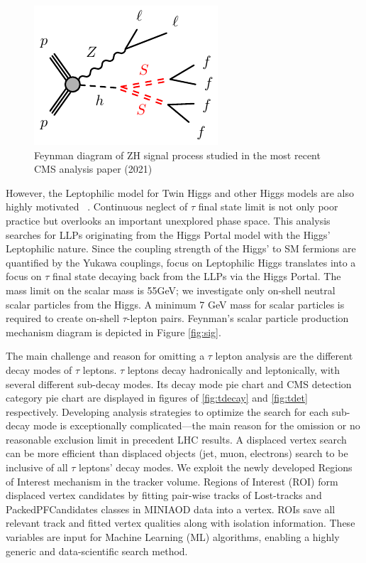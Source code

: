 \begin{figure}[h!]
  \caption{Feynman diagram of ZH signal process studied in the most recent CMS analysis paper (2021) \cite{ZHAN}}
  \label{fig:ZHfeyn}
  \centering
  \includegraphics[width=0.47\linewidth]{figs/Zh-llffff-SS.pdf}
\end{figure}


However, the Leptophilic model for Twin Higgs and other Higgs models are also highly motivated ~\cite{Lepto}. Continuous neglect of $\tau$ final state limit is not only poor practice but overlooks an important unexplored phase space.
This analysis searches for LLPs originating from the Higgs Portal model with the Higgs' Leptophilic nature.
Since the coupling strength of the Higgs' to SM fermions are quantified by the Yukawa couplings, focus on Leptophilic Higgs translates into a focus on $\tau$ final state decaying back from the LLPs via the Higgs Portal.
The mass limit on the scalar mass is 55GeV; we investigate only on-shell neutral scalar particles from the Higgs.
A minimum 7 GeV mass for scalar particles is required to create on-shell $\tau$-lepton pairs.
Feynman's scalar particle production mechanism diagram is depicted in Figure \ref{fig:sig}.


The main challenge and reason for omitting a $\tau$ lepton analysis are the different decay modes of $\tau$ leptons.
$\tau$ leptons decay hadronically and leptonically, with several different sub-decay modes.
Its decay mode pie chart and CMS detection category pie chart are displayed in figures of \ref{fig:tdecay} and \ref{fig:tdet} respectively.
Developing analysis strategies to optimize the search for each sub-decay mode is exceptionally complicated—the main reason for the omission or no reasonable exclusion limit in precedent LHC results.
A displaced vertex search can be more efficient than displaced objects (jet, muon, electrons) search to be inclusive of all $\tau$ leptons' decay modes.
We exploit the newly developed Regions of Interest mechanism in the tracker volume.
Regions of Interest (ROI) form displaced vertex candidates by fitting pair-wise tracks of Lost-tracks and PackedPFCandidates classes in MINIAOD data into a vertex.
ROIs save all relevant track and fitted vertex qualities along with isolation information.
These variables are input for Machine Learning (ML) algorithms, enabling a highly generic and data-scientific search method.

